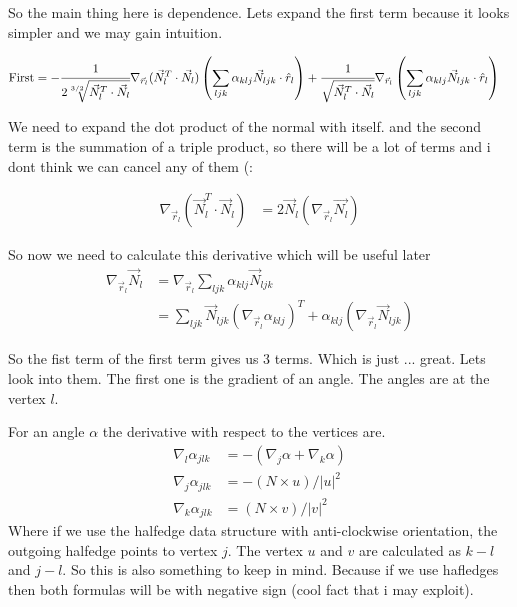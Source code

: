 \documentclass[11pt]{article}
\theoremstyle{plain}
\theoremstyle{definition}
\begin{document}
So the main thing here is dependence.
Lets expand the first term because it looks simpler and we may gain intuition.


\begin{align}
  \text{First}&= -\cfrac{1}{2\sqrt[3/2]{\vec{N}^T_l \cdot \vec{N}_l}} \nabla_{\vec{r}_l}(\vec{N}_l^T \cdot \vec{N}_l)  \left(\sum_{ljk}\alpha_{klj}\vec{N}_{ljk}\cdot \hat{r}_l\right)+\cfrac{1}{\sqrt{\vec{N}_l^T\cdot \vec{N}_l}} \nabla_{\vec{r}_l}\left(\sum_{ljk}\alpha_{klj}\vec{N}_{ljk}\cdot \hat{r}_l\right)
\end{align}

We need to expand the dot product of the normal with itself. and the second term is the summation of a triple product, so there will be a lot of terms and i dont think we can cancel any of them (:


\begin{align}
  \nabla_{\vec{r}_l} \left(\vec{N}_l^T\cdot \vec{N}_l\right) &= 2\vec{N}_l\left(\nabla_{\vec{r}_l}\vec{N_l}\right)  
\end{align}
 
So now we need to calculate this derivative which will be useful later 
\begin{align}
  \nabla_{\vec{r}_l} \vec{N}_l &=\nabla_{\vec{r}_l} \sum_{ljk}\alpha_{klj}\vec{N}_{ljk}\\
  &=\sum_{ljk}\vec{N}_{ljk}(\nabla_{\vec{r}_l}\alpha_{klj})^T+\alpha_{klj}(\nabla_{\vec{r}_l}\vec{N}_{ljk})
\end{align}

So the fist term of the first term gives us $3$ terms. Which is just ... great. Lets look into them. The first one is the gradient of an angle. The angles are at the vertex $l$.



For an angle $\alpha$ the derivative with respect to the vertices are.
\begin{align}
  \nabla_l\alpha_{jlk} &= -(\nabla_j \alpha + \nabla_k \alpha)\\
  \nabla_j\alpha_{jlk} &= -(N\times u )/|u|^2\\
  \nabla_k\alpha_{jlk} &= (N\times v)/|v|^2 
\end{align}
Where if we use the halfedge data structure with anti-clockwise orientation, the outgoing halfedge points to vertex $j$. The vertex $u$ and $v$ are calculated as $k-l$ and $j-l$. So this is also something to keep in mind. Because if we use hafledges then both formulas will be with negative sign (cool fact that i may exploit).
\end{document}
